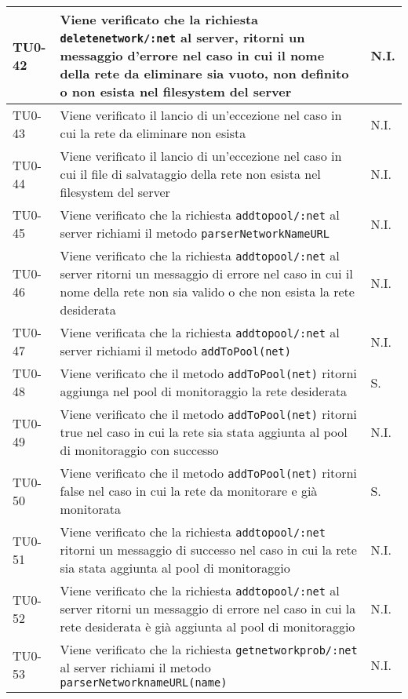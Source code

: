 \begin{longtable}{|C{.15\textwidth}|m{.66\textwidth}|C{.10\textwidth}|}
 \hline
 TU0-42 & Viene verificato che la richiesta \texttt{deletenetwork/:net} al server, ritorni un messaggio d'errore nel caso in cui il nome della rete da eliminare sia vuoto,  non definito o non esista nel filesystem del server & N.I. \\ 
 \hline
{}TU0-43 & Viene verificato il lancio di un'eccezione nel caso in cui la rete da eliminare non esista & N.I. \\ 
\hline
 TU0-44 & Viene verificato il lancio di un'eccezione nel caso in cui il file di salvataggio della rete non esista nel filesystem del server & N.I. \\ 
 \hline
  TU0-45 & Viene verificato che la richiesta \texttt{addtopool/:net} al server richiami il metodo \texttt{parserNetworkNameURL} & N.I. \\ 
 \hline
 TU0-46 & Viene verificato che la richiesta \texttt{addtopool/:net} al server ritorni un messaggio di errore nel caso in cui il nome della rete non sia valido o che non esista la rete desiderata & N.I. \\ 
 \hline
 TU0-47 & Viene verificata che la richiesta \texttt{addtopool/:net} al server richiami il metodo \texttt{addToPool(net)} & N.I. \\ 
 \hline
 TU0-48 & Viene verificato che il metodo \texttt{addToPool(net)} ritorni aggiunga nel pool di monitoraggio la rete desiderata & S. \\
\hline
{} TU0-49 & Viene verificato che il metodo \texttt{addToPool(net)} ritorni true nel caso in cui la rete sia stata aggiunta al pool di monitoraggio con successo & N.I. \\ 
\hline 
TU0-50 & Viene verificato che il metodo \texttt{addToPool(net)} ritorni false nel caso in cui la rete da monitorare e già monitorata & S. \\ 
\hline
{} TU0-51 & Viene verificato che la richiesta \texttt{addtopool/:net} ritorni un messaggio di successo nel caso in cui la rete sia stata aggiunta al pool di monitoraggio & N.I. \\ 
\hline 
TU0-52 & Viene verificato che la richiesta \texttt{addtopool/:net} al server ritorni un messaggio di errore nel caso in cui la rete desiderata è già aggiunta al pool di monitoraggio & N.I. \\ 
\hline 
{} TU0-53 & Viene verificato che la richiesta \texttt{getnetworkprob/:net} al server richiami il metodo \texttt{parserNetworknameURL(name)} &  N.I. \\ 

\end{longtable}
